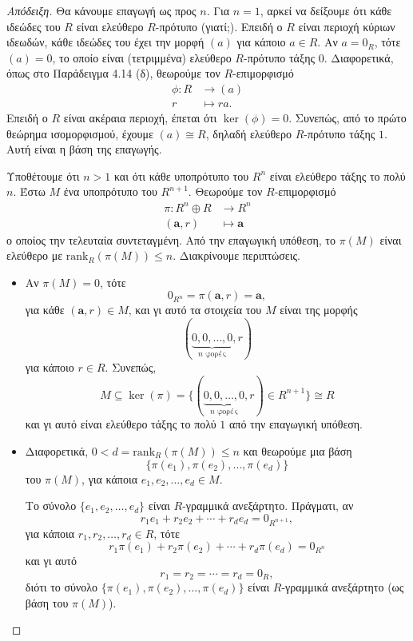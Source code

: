 \documentclass[12pt,a4paper,reqno]{amsart}
\theoremstyle{definition}
\theoremstyle{remark}
\numberwithin{theorem}{section}
\numberwithin{exercise}{section}
\numberwithin{equation}{section}
\newcommand{\bfa}{\mathbf{a}}
\renewcommand{\to}{\rightarrow}
\newcommand{\rmrank}{\mathrm{rank}}
\begin{document}
\begin{proof}[Απόδειξη]
    Θα κάνουμε επαγωγή ως προς $n$. Για $n=1$, αρκεί να δείξουμε ότι κάθε ιδεώδες του $R$ είναι ελεύθερο $R$-πρότυπο (γιατί;). Επειδή ο $R$ είναι περιοχή κύριων ιδεωδών, κάθε ιδεώδες του έχει την μορφή $(a)$ για κάποιο $a \in R$. Αν $a = 0_R$, τότε $(a) = 0$, το οποίο είναι (τετριμμένα) ελεύθερο $R$-πρότυπο τάξης $0$. Διαφορετικά, όπως στο Παράδειγμα 4.14 (δ), θεωρούμε τον $R$-επιμορφισμό 
    \begin{align*}
        \phi : R &\to (a) \\
                r &\mapsto ra.
    \end{align*}
    Επειδή ο $R$ είναι ακέραια περιοχή, έπεται ότι $\ker(\phi) = 0$. Συνεπώς, από το πρώτο θεώρημα ισομορφισμού, έχουμε $(a) \cong R$, δηλαδή ελεύθερο $R$-πρότυπο τάξης $1$. Αυτή είναι η βάση της επαγωγής.

    Υποθέτουμε ότι $n > 1$ και ότι κάθε υποπρότυπο του $R^n$ είναι ελεύθερο τάξης το πολύ $n$. Έστω $M$ ένα υποπρότυπο του $R^{n+1}$. Θεωρούμε τον $R$-επιμορφισμό 
    \begin{align*}
        \pi : R^n \oplus R &\to R^n \\
        (\bfa, r) &\mapsto \bfa
    \end{align*}
    ο οποίος  την τελευταία συντεταγμένη. Από την επαγωγική υπόθεση, το $\pi(M)$ είναι ελεύθερο με $\rmrank_R\left(
        \pi(M)
    \right) \le n$. Διακρίνουμε περιπτώσεις.
    \begin{itemize}
        \item Αν $\pi(M) = 0$, τότε
        \[
        0_{R^n} = \pi(\bfa,r) = \bfa,
        \]
        για κάθε $(\bfa,r)\in M$, και γι αυτό τα στοιχεία του $M$ είναι της μορφής 
        \[
        (\underbrace{0, 0, \dots, 0}_{\text{$n$ φορές}}, r)
        \]
        για κάποιο $r \in R$. Συνεπώς,
        \[
        M \subseteq \ker(\pi) = \{(\underbrace{0, 0, \dots, 0}_{\text{$n$ φορές}}, r) \in R^{n+1}\} \cong R
        \]
        και γι αυτό είναι ελεύθερο τάξης το πολύ $1$ από την επαγωγική υπόθεση.

        \item Διαφορετικά, $0 < d = \rmrank_R(\pi(M)) \le n$ και θεωρούμε μια βάση
        \[
        \{\pi(e_1), \pi(e_2), \dots, \pi(e_d)\}
        \]
        του $\pi(M)$, για κάποια $e_1, e_2, \dots, e_d \in M$. 
        
        Το σύνολο $\{e_1, e_2, \dots, e_d\}$ είναι $R$-γραμμικά ανεξάρτητο. Πράγματι, αν 
        \[
        r_1e_1 + r_2e_2 + \cdots + r_de_d = 0_{R^{n+1}},
        \]
        για κάποια $r_1, r_2, \dots, r_d \in R$, τότε 
        \[
        r_1\pi(e_1) + r_2\pi(e_2) + \cdots + r_d\pi(e_d) = 0_{R^n}
        \]
        και γι αυτό 
        \[
        r_1 = r_2 = \cdots = r_d = 0_R,
        \]
        διότι το σύνολο $\{\pi(e_1), \pi(e_2), \dots, \pi(e_d)\}$ είναι $R$-γραμμικά ανεξάρτητο (ως βάση του $\pi(M)$).
        

\end{itemize}
\end{proof}
\end{document}
